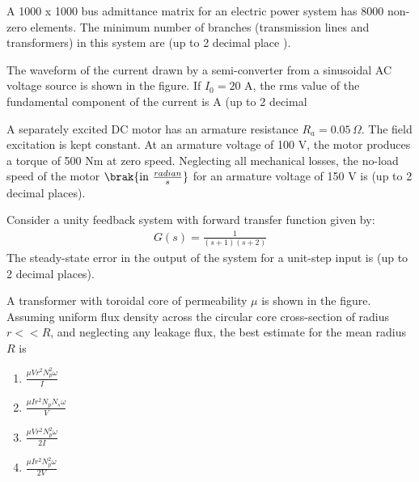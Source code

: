 \item A 1000 x 1000 bus admittance matrix for an electric power system has 8000 non-zero elements. The minimum number of branches (transmission lines and transformers) in this system are  \underline{\hspace{1cm}} (up to 2 decimal place ).
\item The waveform of the current drawn by a semi-converter from a sinusoidal AC voltage source is shown in the figure. If $I_0 = 20$ A, the rms value of the fundamental component of the current is \underline{\hspace{1cm}} A (up to 2 decimal
    \begin{figure}[!ht]
    \centering
    \label{fig:power system network}
    \end{figure}
\item A separately excited DC motor has an armature resistance $R_a = 0.05 \, \Omega$. The field excitation is kept constant. At an armature voltage of 100 V, the motor produces a torque of 500 Nm at zero speed. Neglecting all mechanical losses, the no-load speed of the motor $\brak{\text{in} \ \frac{radian}{s}}$ for an armature voltage of 150 V is \underline{\hspace{1cm}} (up to 2 decimal places).
\item Consider a unity feedback system with forward transfer function given by:
\begin{align}
G(s) = \frac{1}{(s+1)(s+2)}
\end{align}
The steady-state error in the output of the system for a unit-step input is \underline{\hspace{1cm}} (up to 2 decimal places).
\item A transformer with toroidal core of permeability $\mu$ is shown in the figure. Assuming uniform flux density across the circular core cross-section of radius $r << R$, and neglecting any leakage flux, the best estimate for the mean radius $R$ is
\begin{figure}[!ht]
    \centering
    \label{fig:power system network}
    \end{figure}
\begin{enumerate}
    \item $\frac{\mu V r^2 N_p^2 \omega}{I}$
    \item $\frac{\mu I r^2 N_p N_s \omega}{V}$
    \item $\frac{\mu V r^2 N_p^2 \omega}{2I}$
    \item $\frac{\mu I r^2 N_p^2 \omega}{2V}$
\end{enumerate}
